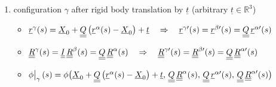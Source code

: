 \begin{frame}
\begin{enumerate}
    \item configuration $\gamma$ after rigid body translation by $\underline{t}$ (arbitrary $\underline{t} \in \mathbb{R}^3$)
      \begin{itemize}
        \item $\underline{r}^{\gamma}(s) = \underline{X}_0 + \underline{\underline{Q}} \left( \underline{r}^{\alpha}(s) - \underline{X}_0 \right) + \underline{t} \quad \Rightarrow \quad \underline{r}^{\gamma \prime}(s) = \underline{r}^{\beta \prime}(s) = \underline{\underline{Q}} \,\underline{r}^{\alpha \prime}(s)$
        \item $\underline{\underline{R}}^{\gamma}(s) = \underline{\underline{I}} \, \underline{\underline{R}}^{\beta}(s) = \underline{\underline{Q}} \, \underline{\underline{R}}^{\alpha}(s) \quad \Rightarrow \quad \underline{\underline{R}}^{\gamma \prime}(s) = \underline{\underline{R}}^{\beta \prime}(s) = \underline{\underline{Q}} \, \underline{\underline{R}}^{\alpha \prime}(s)$
        \item $\eval[1]{\phi}_{\gamma}(s) = \phi \bigl( \underline{X}_0 + \doubleunderline{Q} \left( \underline{r}^{\alpha}(s) - \underline{X}_0 \right) + \underline{t} , \, \doubleunderline{Q} \, \doubleunderline{R}^{\alpha}(s) , \, \doubleunderline{Q} \,\underline{r}^{\alpha \prime}(s) , \, \doubleunderline{Q} \, \doubleunderline{R}^{\alpha \prime}(s) \bigr)$
      \end{itemize}
  \end{enumerate}
\end{frame}



